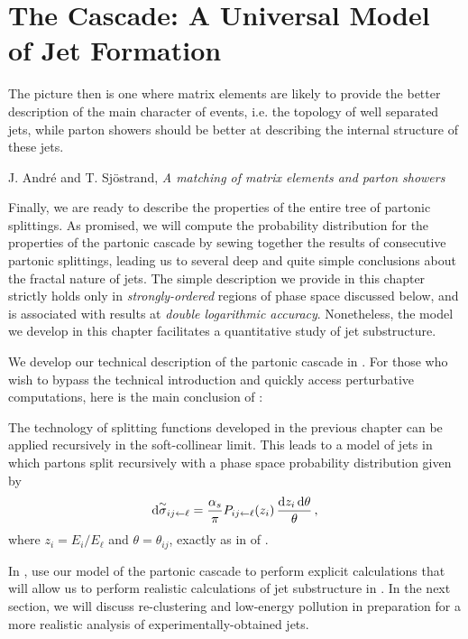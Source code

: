 \section{The Cascade: A Universal Model of Jet Formation}
\label{sec:parton-shower}

\epigraph{The picture then is one where matrix elements are likely to provide the better description of the main character of events, i.e. the topology of well separated jets, while parton showers should be better at describing the internal structure of these jets.}{J. Andr\'e and T. Sj\"ostrand, \textit{A matching of matrix elements and parton showers} \cite{Andre:1997vh}}



Finally, we are ready to describe the properties of the entire tree of partonic splittings.
%
As promised, we will compute the probability distribution for the properties of the partonic cascade by sewing together the results of consecutive partonic splittings, leading us to several deep and quite simple conclusions about the fractal nature of jets.
%
The simple description we provide in this chapter strictly holds only in \textit{strongly-ordered} regions of phase space discussed below, and is associated with results at \textit{double logarithmic accuracy}.
%
Nonetheless, the model we develop in this chapter facilitates a quantitative study of jet substructure.

We develop our technical description of the partonic cascade in .
%
For those who wish to bypass the technical introduction and quickly access perturbative computations, here is the main conclusion of :
\begin{answer}
    The technology of splitting functions developed in the previous chapter can be applied recursively in the soft-collinear limit.
    This leads to a model of jets in which partons split recursively with a phase space probability distribution given by
    \begin{align}
        \dd \overset{\sim}{\sigma}_{ij\leftarrow \ell}
        =
        \frac{\alpha_s}{\pi}
        P_{ij \leftarrow \ell}(z_i)\,\frac{\dd z_i \, \dd \theta}{\theta}
        \,,
    \end{align}
    where \(z_i = E_i / E_\ell\) and \(\theta = \theta_{ij}\), exactly as in  of .
\end{answer}
In , use our model of the partonic cascade to perform explicit calculations that will allow us to perform realistic calculations of jet substructure in .
%
In the next section, we will discuss re-clustering and low-energy pollution in preparation for a more realistic analysis of experimentally-obtained jets.




